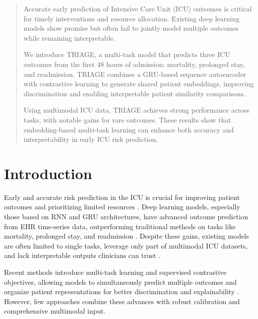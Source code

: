\documentclass{article}
\theoremstyle{plain}
\theoremstyle{definition}
\theoremstyle{remark}
\begin{document}


\begin{abstract}
Accurate early prediction of Intensive Care Unit (ICU) outcomes is critical for timely interventions and resource allocation. Existing deep learning models show promise but often fail to jointly model multiple outcomes while remaining interpretable.

We introduce TRIAGE, a multi-task model that predicts three ICU outcomes from the first 48 hours of admission: mortality, prolonged stay, and readmission. TRIAGE combines a GRU-based sequence autoencoder with contrastive learning to generate shared patient embeddings, improving discrimination and enabling interpretable patient similarity comparisons.

Using multimodal ICU data, TRIAGE achieves strong performance across tasks, with notable gains for rare outcomes. These results show that embedding-based multi-task learning can enhance both accuracy and interpretability in early ICU risk prediction.
\end{abstract}

\section{Introduction}

Early and accurate risk prediction in the ICU is crucial for improving patient outcomes and prioritizing limited resources \cite{deasy2020dynamic}. Deep learning models, especially those based on RNN and GRU architectures, have advanced outcome prediction from EHR time-series data, outperforming traditional methods on tasks like mortality, prolonged stay, and readmission \cite{shukla2020integrating, ruan2025evidence, deng2022explainable}. Despite these gains, existing models are often limited to single tasks, leverage only part of multimodal ICU datasets, and lack interpretable outputs clinicians can trust \cite{deng2022explainable, zang2021scehr}.

Recent methods introduce multi-task learning and supervised contrastive objectives, allowing models to simultaneously predict multiple outcomes and organize patient representations for better discrimination and explainability \cite{zang2021scehr, ma2024global}. However, few approaches combine these advances with robust calibration and comprehensive multimodal input.
\end{document}

